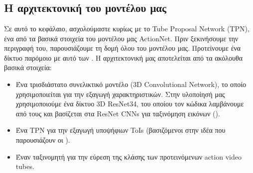 



% 


% 
\gr 
\chapter{}
\section{ Η αρχιτεκτονική του μοντέλου μας}
Σε αυτό το κεφάλαιο, ασχολούμαστε κυρίως με  το \en Tube Proposal Network (TPN)\gr, ένα από τα βασικά στοιχεία του μοντέλου μας \en ActionNet\gr. Πριν ξεκινήσουμε την
περιγραφή του, παρουσιάζουμε τη δομή όλου του μοντέλου μας. Προτείνουμε ένα δίκτυο παρόμοιο με αυτό των \en\cite{DBLP:journals/corr/HouCS17}\gr.
Η αρχιτεκτονική μας αποτελείται από τα ακόλουθα βασικά στοιχεία:
\begin{itemize}
\item Ένα τρισδιάστατο συνελικτικό μοντέλο \en(3D Convolutional Network)\gr, το οποίο χρησιμοποιείται για την εξαγωγή χαρακτηριστικών.
  Στην υλοποίησή μας χρησιμοποιούμε ένα δίκτυο \en 3D ResNet34\gr, του  οποίου τον κώδικα  λαμβάνουμε  από τους \en\cite{hara3dcnns} \gr  και βασίζεται   στα \en ResNet CNNs \gr για  ταξινόμηση εικόνων \en(\cite{DBLP:journals/corr/HeZRS15})\gr.
\item Ένα \en TPN \gr για την εξαγωγή υποψήφιων \en ToIs \gr (βασιζόμενοι στην ιδέα που παρουσιάζουν οι \en \cite{DBLP:journals/corr/HouCS17} \gr).
\item Έναν ταξινομητή για την εύρεση της κλάσης των προτεινόμενων \en action video tubes\gr.
\end{itemize}

